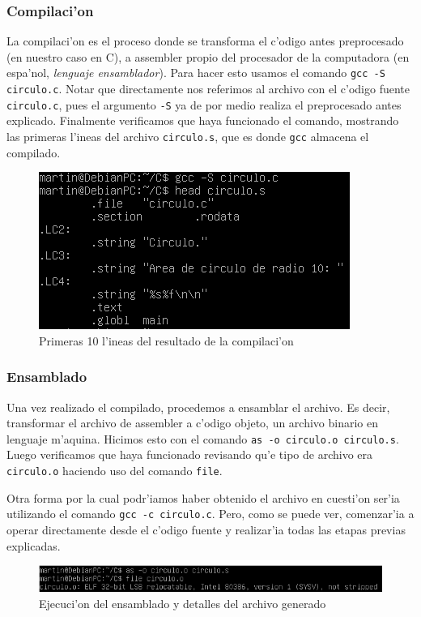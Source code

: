 \documentclass[11pt]{article}
\begin{document}
	\subsubsection{Compilaci'on}
		La compilaci'on es el proceso donde se transforma el c'odigo antes preprocesado (en nuestro caso en C), a assembler propio del procesador de la computadora (en espa'nol, \textit{lenguaje ensamblador}). Para hacer esto usamos el comando \texttt{gcc -S circulo.c}. Notar que directamente nos referimos al archivo con el c'odigo fuente \texttt{circulo.c}, pues el argumento \texttt{-S} ya de por medio realiza el preprocesado antes explicado. Finalmente verificamos que haya funcionado el comando, mostrando las primeras l'ineas del archivo \texttt{circulo.s}, que es donde \texttt{gcc} almacena el compilado.

		\begin{figure}[H]
			\centering
			\includegraphics[width=.7\linewidth]{Images/Seccion 1/S1 parte tres.PNG}
			\caption{Primeras 10 l'ineas del resultado de la compilaci'on}
			\label{fig:complex-compilation}
		\end{figure}
		
	\subsubsection{Ensamblado}
		Una vez realizado el compilado, procedemos a ensamblar el archivo. Es decir, transformar el archivo de assembler a c'odigo objeto, un archivo binario en lenguaje m'aquina. Hicimos esto con el comando \texttt{as -o circulo.o circulo.s}. Luego verificamos que haya funcionado revisando qu'e tipo de archivo era \texttt{circulo.o} haciendo uso del comando \texttt{file}.
		
		Otra forma por la cual podr'iamos haber obtenido el archivo en cuesti'on ser'ia utilizando el comando \texttt{gcc -c circulo.c}. Pero, como se puede ver, comenzar'ia a operar directamente desde el c'odigo fuente y realizar'ia todas las etapas previas explicadas.
		
		\begin{figure}[H]
			\centering
			\includegraphics[width=.9\linewidth]{Images/Seccion 1/S1 parte cuatro}
			\caption{Ejecuci'on del ensamblado y detalles del archivo generado}
			\label{fig:complex-assembly}
		\end{figure}
	
\end{document}
